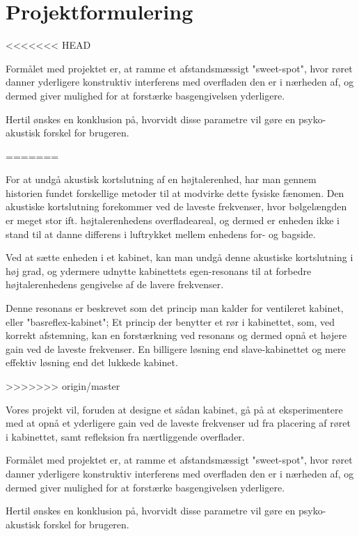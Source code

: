 \chapter{Projektformulering}

<<<<<<< HEAD

Formålet med projektet er, at ramme et afstandsmæssigt "sweet-spot", hvor røret danner yderligere konstruktiv interferens med overfladen den er i nærheden af, og dermed giver mulighed for at forstærke basgengivelsen yderligere. 



Hertil ønskes en konklusion på, hvorvidt disse parametre vil gøre en psyko-akustisk forskel for brugeren. 

=======

For at undgå akustisk kortslutning af en højtalerenhed, har man gennem historien fundet forskellige metoder til at modvirke dette fysiske fænomen. 
Den akustiske kortslutning forekommer ved de laveste frekvenser, hvor bølgelængden er meget stor ift. højtalerenhedens overfladeareal, og dermed er enheden ikke i stand til at danne differens i luftrykket mellem enhedens for- og bagside.

Ved at sætte enheden i et kabinet, kan man undgå denne akustiske kortslutning i høj grad, og ydermere udnytte kabinettets egen-resonans til at forbedre højtalerenhedens gengivelse af de lavere frekvenser. 

Denne resonans er beskrevet som det princip man kalder for ventileret kabinet, eller "basreflex-kabinet"; Et princip der benytter et rør i kabinettet, som, ved korrekt afstemning, kan en forstærkning ved resonans og dermed opnå et højere gain ved de laveste frekvenser. En billigere løsning end slave-kabinettet og mere effektiv løsning end det lukkede kabinet. 

>>>>>>> origin/master

Vores projekt vil, foruden at designe et sådan kabinet, gå på at eksperimentere med at opnå et yderligere gain ved de laveste frekvenser ud fra placering af røret i kabinettet, samt refleksion fra nærtliggende overflader. 

Formålet med projektet er, at ramme et afstandsmæssigt "sweet-spot", hvor røret danner yderligere konstruktiv interferens med overfladen den er i nærheden af, og dermed giver mulighed for at forstærke basgengivelsen yderligere. 

Hertil ønskes en konklusion på, hvorvidt disse parametre vil gøre en psyko-akustisk forskel for brugeren. 
